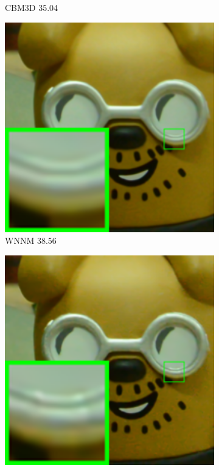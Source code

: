 \begin{figure}
\begin{subfigure}[t]{0.19\textwidth}
		\caption{CBM3D 35.04}
    \end{subfigure}
    \hfill
    \begin{subfigure}[t]{0.19\textwidth}
        \centering
        \includegraphics[width=1\textwidth]{images/twsc/cc/resize_br_WNNM_d800_iso3200_1_real.png}
\caption{WNNM 38.56}
    \end{subfigure}
    \hfill
    \begin{subfigure}[t]{0.19\textwidth}
        \centering
        \includegraphics[width=1\textwidth]{images/twsc/cc/resize_br_TRD_d800_iso3200_1_real.png}

\end{subfigure}
\end{figure}
